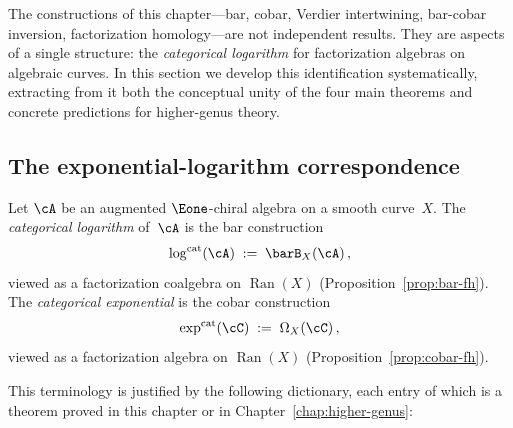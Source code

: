 The constructions of this chapter---bar, cobar, Verdier intertwining,
bar-cobar inversion, factorization homology---are not independent
results.  They are aspects of a single structure: the
\emph{categorical logarithm} for factorization algebras on algebraic
curves.  In this section we develop this identification
systematically, extracting from it both the conceptual unity of the
four main theorems and concrete predictions for higher-genus theory.

\subsection{The exponential-logarithm correspondence}
\label{subsec:exp-log-correspondence}

\begin{definition}
\label{def:categorical-log-exp}
Let $\cA$ be an augmented $\Eone$-chiral algebra on a smooth
curve~$X$.  The \emph{categorical logarithm} of~$\cA$ is the bar
construction
\[
\log^{\mathrm{cat}}(\cA) \;:=\; \barB_X(\cA)\,,
\]
viewed as a factorization coalgebra on $\operatorname{Ran}(X)$
(Proposition~\ref{prop:bar-fh}).  The \emph{categorical exponential}
is the cobar construction
\[
\exp^{\mathrm{cat}}(\cC) \;:=\; \Omega_X(\cC)\,,
\]
viewed as a factorization algebra on $\operatorname{Ran}(X)$
(Proposition~\ref{prop:cobar-fh}).
\end{definition}

This terminology is justified by the following dictionary, each entry
of which is a theorem proved in this chapter or in
Chapter~\ref{chap:higher-genus}:

